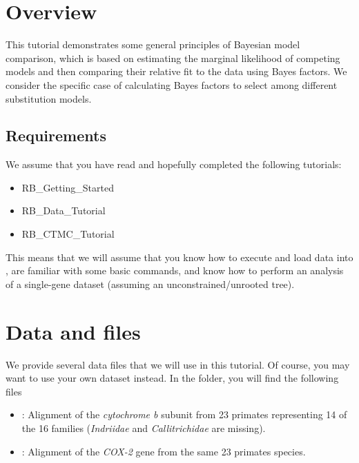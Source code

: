 \section{Overview}


This tutorial demonstrates some general principles of Bayesian model comparison, which is based on estimating the marginal likelihood of competing models and then comparing their relative fit to the data using Bayes factors.
We consider the specific case of calculating Bayes factors to select among different substitution models.

\subsection{Requirements}
We assume that you have read and hopefully completed the following tutorials:
\begin{itemize}
\item RB\_Getting\_Started
\item RB\_Data\_Tutorial
\item RB\_CTMC\_Tutorial
\end{itemize}
This means that we will assume that you know how to execute and load data into \RevBayes, are familiar with some basic commands, and know how to perform an analysis of a single-gene dataset (assuming an unconstrained/unrooted tree).



\section{Data and files}

We provide several data files that we will use in this tutorial.
Of course, you may want to use your own dataset instead.
In the  folder, you will find the following files
\begin{itemize}
\item
{}: Alignment of the \textit{cytochrome b} subunit from 23 primates representing 14 of the 16 families (\textit{Indriidae} and \textit{Callitrichidae} are missing).
\item
{}: Alignment of the \textit{COX-2} gene from the same 23 primates species.
\end{itemize}



